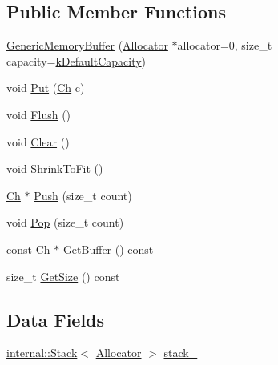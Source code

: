 \subsection*{Public Member Functions}
\begin{DoxyCompactItemize}
\item 
\mbox{\hyperlink{structrapidjson_1_1_generic_memory_buffer_a56c70223d8897e245df31e22a1fea60f}{Generic\+Memory\+Buffer}} (\mbox{\hyperlink{classrapidjson_1_1_allocator}{Allocator}} $\ast$allocator=0, size\+\_\+t capacity=\mbox{\hyperlink{structrapidjson_1_1_generic_memory_buffer_abaa207fb3f94da48b0c91755828f98b3}{k\+Default\+Capacity}})
\item 
void \mbox{\hyperlink{structrapidjson_1_1_generic_memory_buffer_a882b45865eb98aa84241ef8b87bae96d}{Put}} (\mbox{\hyperlink{structrapidjson_1_1_generic_memory_buffer_a7c2ccd0d38df6d3cb3abd5aed9e100f8}{Ch}} c)
\item 
void \mbox{\hyperlink{structrapidjson_1_1_generic_memory_buffer_a66a3e80663d94506cab0117777486a06}{Flush}} ()
\item 
void \mbox{\hyperlink{structrapidjson_1_1_generic_memory_buffer_a1b2639889f687f0f6f1b90181918f273}{Clear}} ()
\item 
void \mbox{\hyperlink{structrapidjson_1_1_generic_memory_buffer_af10d96902f7aea2eae23269c11398fbb}{Shrink\+To\+Fit}} ()
\item 
\mbox{\hyperlink{structrapidjson_1_1_generic_memory_buffer_a7c2ccd0d38df6d3cb3abd5aed9e100f8}{Ch}} $\ast$ \mbox{\hyperlink{structrapidjson_1_1_generic_memory_buffer_a070ea27ab1e80df671ced9edb7d03150}{Push}} (size\+\_\+t count)
\item 
void \mbox{\hyperlink{structrapidjson_1_1_generic_memory_buffer_abcbad3bf8a20a90b6b586e63b07aed40}{Pop}} (size\+\_\+t count)
\item 
const \mbox{\hyperlink{structrapidjson_1_1_generic_memory_buffer_a7c2ccd0d38df6d3cb3abd5aed9e100f8}{Ch}} $\ast$ \mbox{\hyperlink{structrapidjson_1_1_generic_memory_buffer_a2c05ddb3b37a57fc941d7b377e95b67a}{Get\+Buffer}} () const
\item 
size\+\_\+t \mbox{\hyperlink{structrapidjson_1_1_generic_memory_buffer_a67f68c4192d6f1a7a90315f5c9bf2930}{Get\+Size}} () const
\end{DoxyCompactItemize}
\subsection*{Data Fields}
\begin{DoxyCompactItemize}
\item 
\mbox{\hyperlink{classrapidjson_1_1internal_1_1_stack}{internal\+::\+Stack}}$<$ \mbox{\hyperlink{classrapidjson_1_1_allocator}{Allocator}} $>$ \mbox{\hyperlink{structrapidjson_1_1_generic_memory_buffer_a80a159ebb64cee80b5e7fc37f971d5a5}{stack\+\_\+}}
\end{DoxyCompactItemize}
